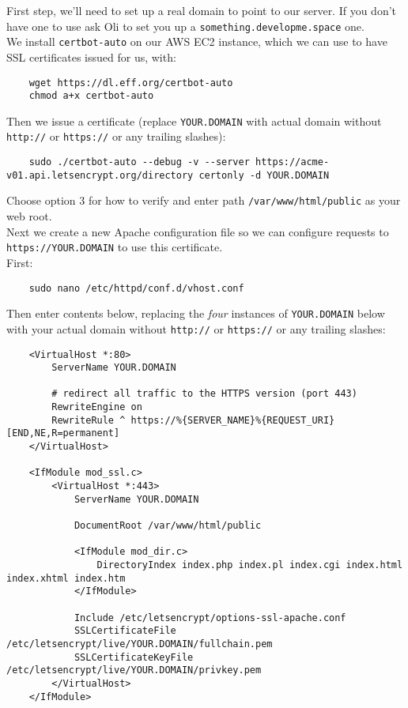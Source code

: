 First step, we'll need to set up a real domain to point to our server. If you don't have one to use ask Oli to set you up a \texttt{something.developme.space} one.
\\

We install \texttt{certbot-auto} on our AWS EC2 instance, which we can use to have SSL certificates issued for us, with:

\begin{verbatim}
    wget https://dl.eff.org/certbot-auto
    chmod a+x certbot-auto
\end{verbatim}

Then we issue a certificate (replace \texttt{YOUR.DOMAIN} with actual domain without \texttt{http://} or \texttt{https://} or any trailing slashes):

\begin{verbatim}
    sudo ./certbot-auto --debug -v --server https://acme-v01.api.letsencrypt.org/directory certonly -d YOUR.DOMAIN
\end{verbatim}

Choose option 3 for how to verify and enter path \texttt{/var/www/html/public} as your web root.
\\

Next we create a new Apache configuration file so we can configure requests to \texttt{https://YOUR.DOMAIN} to use this certificate.
\\

First:

\begin{verbatim}
    sudo nano /etc/httpd/conf.d/vhost.conf
\end{verbatim}

Then enter contents below, replacing the \textit{four} instances of \texttt{YOUR.DOMAIN} below with your actual domain without \texttt{http://} or \texttt{https://} or any trailing slashes:

\begin{verbatim}
    <VirtualHost *:80>
        ServerName YOUR.DOMAIN

        # redirect all traffic to the HTTPS version (port 443)
        RewriteEngine on
        RewriteRule ^ https://%{SERVER_NAME}%{REQUEST_URI} [END,NE,R=permanent]
    </VirtualHost>

    <IfModule mod_ssl.c>
        <VirtualHost *:443>
            ServerName YOUR.DOMAIN

            DocumentRoot /var/www/html/public

            <IfModule mod_dir.c>
                DirectoryIndex index.php index.pl index.cgi index.html index.xhtml index.htm
            </IfModule>

            Include /etc/letsencrypt/options-ssl-apache.conf
            SSLCertificateFile /etc/letsencrypt/live/YOUR.DOMAIN/fullchain.pem
            SSLCertificateKeyFile /etc/letsencrypt/live/YOUR.DOMAIN/privkey.pem
        </VirtualHost>
    </IfModule>
\end{verbatim}


